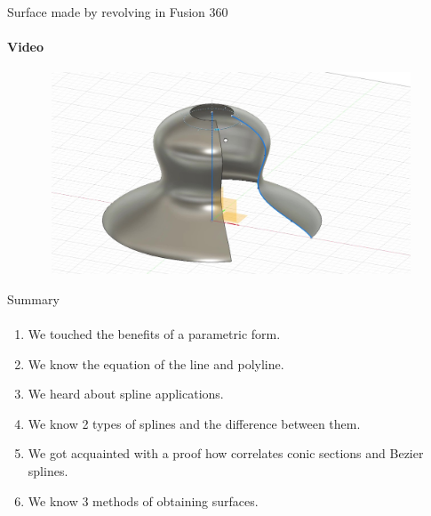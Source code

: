 \documentclass[aspectratio=169]{beamer}
\begin{document}
\begin{frame}[t]{Surface made by revolving in Fusion 360}
    \framesubtitle{Video}
    \vspace{-0.6cm}
    \begin{figure}[H]
        \href{https://disk.yandex.ru/i/esBUsEV6GyFlKQ}{
            \centering\includegraphics[height=6cm,width=1\textwidth,keepaspectratio]{revolving_surface_video_preview.jpg}}
    \end{figure}
\end{frame}
    


\begin{frame}[t]{Summary}
\framesubtitle{}
\begin{enumerate}
    \item We touched the benefits of a parametric form.
    \pause
    \item We know the equation of the line and polyline.
    \pause
    \item We heard about spline applications.
    \pause
    \item We know 2 types of splines and the difference between them.
    \item We got acquainted with a proof how correlates conic sections and Bezier splines.
    \pause
    \item We know 3 methods of obtaining surfaces.
\end{enumerate}

\end{frame}
\end{document}
